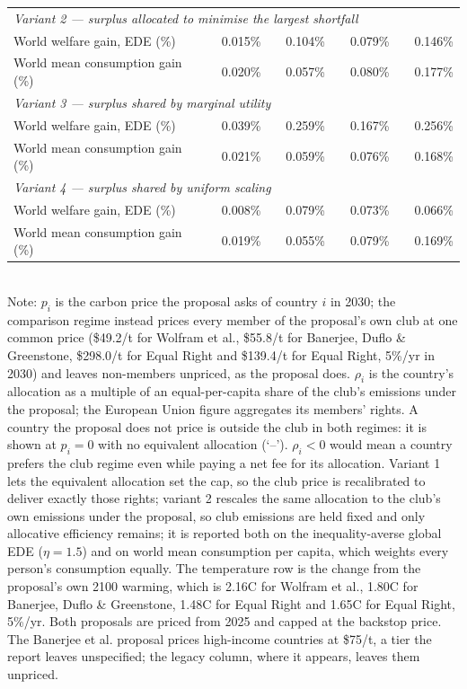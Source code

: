 \begin{table}[htbp]
\begin{tabular}{lcccccccc}
  \midrule
  \multicolumn{9}{l}{\textit{Variant 2 --- surplus allocated to minimise the largest shortfall}} \\
  \quad World welfare gain, EDE (\%) &  & 0.015\% &  & 0.104\% &  & 0.079\% &  & 0.146\% \\
  \quad World mean consumption gain (\%) &  & 0.020\% &  & 0.057\% &  & 0.080\% &  & 0.177\% \\
  \midrule
  \multicolumn{9}{l}{\textit{Variant 3 --- surplus shared by marginal utility}} \\
  \quad World welfare gain, EDE (\%) &  & 0.039\% &  & 0.259\% &  & 0.167\% &  & 0.256\% \\
  \quad World mean consumption gain (\%) &  & 0.021\% &  & 0.059\% &  & 0.076\% &  & 0.168\% \\
  \midrule
  \multicolumn{9}{l}{\textit{Variant 4 --- surplus shared by uniform scaling}} \\
  \quad World welfare gain, EDE (\%) &  & 0.008\% &  & 0.079\% &  & 0.073\% &  & 0.066\% \\
  \quad World mean consumption gain (\%) &  & 0.019\% &  & 0.055\% &  & 0.079\% &  & 0.169\% \\
  \bottomrule
\end{tabular}
\label{tab:equiv_rights_B}
\\[4pt]
{\footnotesize Note: $p_i$ is the carbon price the proposal asks of country $i$ in 2030; the comparison regime instead prices every member of the proposal's own club at one common price (\$49.2/t for Wolfram et al., \$55.8/t for Banerjee, Duflo \& Greenstone, \$298.0/t for Equal Right and \$139.4/t for Equal Right, 5\%/yr in 2030) and leaves non-members unpriced, as the proposal does. $\rho_i$ is the country's allocation as a multiple of an equal-per-capita share of the club's emissions under the proposal; the European Union figure aggregates its members' rights. A country the proposal does not price is outside the club in both regimes: it is shown at $p_i=0$ with no equivalent allocation (`--'). $\rho_i < 0$ would mean a country prefers the club regime even while paying a net fee for its allocation. Variant 1 lets the equivalent allocation set the cap, so the club price is recalibrated to deliver exactly those rights; variant 2 rescales the same allocation to the club's own emissions under the proposal, so club emissions are held fixed and only allocative efficiency remains; it is reported both on the inequality-averse global EDE ($\eta=1.5$) and on world mean consumption per capita, which weights every person's consumption equally. The temperature row is the change from the proposal's own 2100 warming, which is 2.16\textdegree{}C for Wolfram et al., 1.80\textdegree{}C for Banerjee, Duflo \& Greenstone, 1.48\textdegree{}C for Equal Right and 1.65\textdegree{}C for Equal Right, 5\%/yr. Both proposals are priced from 2025 and capped at the backstop price. The Banerjee et al. proposal prices high-income countries at \$75/t, a tier the report leaves unspecified; the legacy column, where it appears, leaves them unpriced.}
\end{table}
